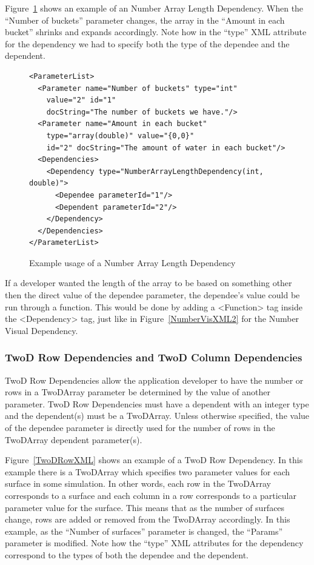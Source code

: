 Figure~\ref{ArrayLengthXML} shows an example of an Number Array Length Dependency. When the ``Number of buckets'' parameter changes, the array in the ``Amount
in each bucket'' shrinks and expands accordingly. Note how in the ``type'' XML attribute for the dependency we had to specify both the type of the dependee and the
dependent. 
\begin{figure}
\centering
{\footnotesize
\begin{Verbatim}
<ParameterList>
  <Parameter name="Number of buckets" type="int"
    value="2" id="1" 
    docString="The number of buckets we have."/>
  <Parameter name="Amount in each bucket" 
    type="array(double)" value="{0,0}"
    id="2" docString="The amount of water in each bucket"/>
  <Dependencies>
    <Dependency type="NumberArrayLengthDependency(int, double)">
      <Dependee parameterId="1"/>
      <Dependent parameterId="2"/>
    </Dependency>
  </Dependencies>
</ParameterList>
\end{Verbatim}
}
\caption{Example usage of a Number Array Length Dependency}
\label{ArrayLengthXML}
\end{figure}

If a developer wanted the length of the array to be based on something other then the direct value of the dependee parameter, the dependee's
value could be run through a function. This would 
be done by adding a <Function> tag inside the <Dependency> tag, just like in Figure~\ref{NumberVisXML2} for the Number Visual Dependency.

\subsubsection{TwoD Row Dependencies and TwoD Column Dependencies}
TwoD Row Dependencies allow the application developer to have the number or rows in a TwoDArray parameter be determined by the value of another
parameter. TwoD Row Dependencies must have a dependent with an integer type and the dependent(s) must be a TwoDArray. Unless otherwise specified, the
value of the dependee parameter is directly used for the number of rows in the TwoDArray dependent parameter(s).

Figure~\ref{TwoDRowXML} shows an example of a TwoD Row Dependency. In this example there is a TwoDArray which specifies two parameter values for each surface
in some simulation. In other words, each row in the TwoDArray corresponds to a surface and each column in a row corresponds to a particular 
parameter value for the surface. This means that as the number of surfaces change, rows are added or removed from the TwoDArray accordingly.
In this example, as the ``Number of surfaces'' parameter is changed, the ``Params'' parameter is modified. Note how the ``type'' XML attributes for 
the dependency correspond to the types of both the dependee and the dependent.

